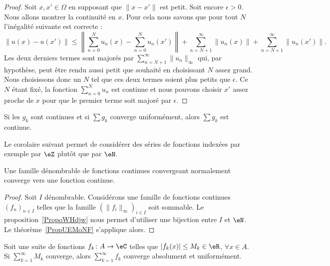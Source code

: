 \begin{proof}
    Soit \( x,x'\in \Omega\) en supposant que \( \| x-x' \|\) est petit. Soit encore \( \epsilon>0\). Nous allons montrer la continuité en \( x\). Pour cela nous savons que pour tout \( N\) l'inégalité suivante est correcte :
    \begin{equation}
        \| u(x)-u(x') \|\leq \left\|  \sum_{n=0}^Nu_n(x)-\sum_{n=0}^{N}u_n(x') \right\|+\sum_{n=N+1}^{\infty}\| u_n(x) \|+\sum_{n=N+1}^{\infty}\| u_n(x') \|.
    \end{equation}
    Les deux derniers termes sont majorés par \( \sum_{n=N+1}^{\infty}\| u_n \|_{\infty}\) qui, par hypothèse, peut être rendu aussi petit que souhaité en choisissant \( N\) assez grand. Nous choisissons donc un \( N\) tel que ces deux termes soient plus petits que \( \epsilon\). Ce \( N\) étant fixé, la fonction \( \sum_{n=0}^{N}u_n\) est continue et nous pouvons choisir \( x'\) assez proche de \( x\) pour que le premier terme soit majoré par \( \epsilon\).
\end{proof}

\begin{theorem}			\label{ThoSerUnifCont}
	Si les $g_k$ sont continues et si $\sum g_k$ converge uniformément, alors $\sum g_k$ est continue.
\end{theorem}

Le corolaire suivant permet de considérer des séries de fonctions indexées par exemple par \( \eZ\) plutôt que par \( \eN\).
\begin{corollary}
    Une famille dénombrable de fonctions continues convergeant normalement converge vers une fonction continue.
\end{corollary}

\begin{proof}
    Soit \( I\) dénombrable. Considérons une famille de fonctions continues \( (f_n)_{n\in I}\) telles que la famille \( (\| f_i \|_{\infty})_{i\in I}\) soit sommable. Le proposition~\ref{PropoWHdjw} nous permet d'utiliser une bijection entre \( I\) et \( \eN\). Le théorème~\ref{PropUEMoNF} s'applique alors.
\end{proof}

\begin{theorem}		\label{ThoCritWeierstrass}
	Soit une suite de fonctions $f_k\colon A\to \eC$ telles que $| f_k(x) |\leq M_k\in\eR$, $\forall x\in A$. Si $\sum_{k=1}^{\infty}M_k$ converge, alors $\sum_{k=1}^{\infty}f_k$ converge absolument et uniformément.
\end{theorem}

